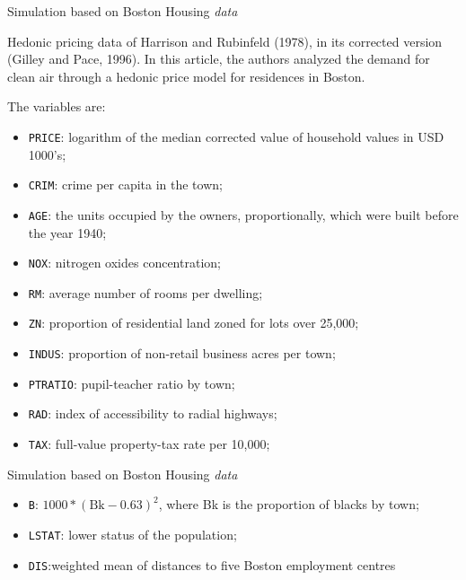 \documentclass[10pt,unknownkeysallowed]{beamer}
\begin{document}
\begin{frame}{Simulation based on Boston Housing \textit{data}}

Hedonic pricing data of Harrison and Rubinfeld (1978), in its corrected version (Gilley and Pace, 1996). In this article, the authors analyzed the demand for clean air through a hedonic price model for residences in Boston.

The variables are:
\begin{itemize}
    \item \texttt{PRICE}: logarithm of the median corrected value of household values in USD 1000's;
    \item \texttt{CRIM}: crime per capita in the town;
    \item \texttt{AGE}: the units occupied by the owners, proportionally, which were built before the year 1940;
    \item \texttt{NOX}: nitrogen oxides concentration;
    \item \texttt{RM}: average number of rooms per dwelling;
    \item  \texttt{ZN}: proportion of residential land zoned for lots over 25,000;
    \item  \texttt{INDUS}: proportion of non-retail business acres per town;
    \item \texttt{PTRATIO}: pupil-teacher ratio by town; 
    \item \texttt{RAD}: index of accessibility to radial highways;
    \item \texttt{TAX}: full-value property-tax rate per 10,000;
    \end{itemize}
    \end{frame}
    
    \begin{frame}{Simulation based on Boston Housing \textit{data}}
    \begin{itemize}
        \item \texttt{B}: $1000*(\textrm{Bk} - 0.63)^2$, where Bk is the proportion of blacks by town;
   \item \texttt{LSTAT}: lower status of the population;
   \item \texttt{DIS}:weighted mean of distances to five Boston employment centres 
    \end{itemize}
\end{frame}
\end{document}
